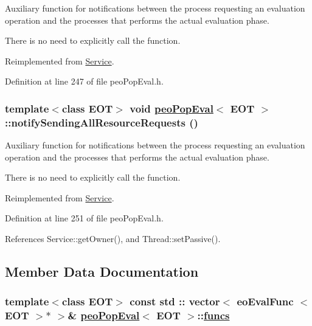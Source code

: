 Auxiliary function for notifications between the process requesting an evaluation operation and the processes that performs the actual evaluation phase. 

There is no need to explicitly call the function. 

Reimplemented from \hyperlink{classService_81ad4d6ebb50045b8977e2ab74826f30}{Service}.

Definition at line 247 of file peo\-Pop\-Eval.h.\hypertarget{classpeoPopEval_b1e33394ba9797237cb8c7c1f410bd67}{
\subsubsection[notifySendingAllResourceRequests]{\setlength{\rightskip}{0pt plus 5cm}template$<$class EOT$>$ void \hyperlink{classpeoPopEval}{peo\-Pop\-Eval}$<$ EOT $>$::notify\-Sending\-All\-Resource\-Requests ()}}
\label{classpeoPopEval_b1e33394ba9797237cb8c7c1f410bd67}


Auxiliary function for notifications between the process requesting an evaluation operation and the processes that performs the actual evaluation phase. 

There is no need to explicitly call the function. 

Reimplemented from \hyperlink{classService_f94cc8a5c2665d4574041737e61e9ffc}{Service}.

Definition at line 251 of file peo\-Pop\-Eval.h.

References Service::get\-Owner(), and Thread::set\-Passive().

\subsection{Member Data Documentation}
\hypertarget{classpeoPopEval_5862b3661c5b0531d55870b5f3881d1e}{
\subsubsection[funcs]{\setlength{\rightskip}{0pt plus 5cm}template$<$class EOT$>$ const std :: vector$<$ eo\-Eval\-Func $<$ EOT $>$$\ast$ $>$\& \hyperlink{classpeoPopEval}{peo\-Pop\-Eval}$<$ EOT $>$::\hyperlink{classpeoPopEval_5862b3661c5b0531d55870b5f3881d1e}{funcs}}}
\label{classpeoPopEval_5862b3661c5b0531d55870b5f3881d1e}



